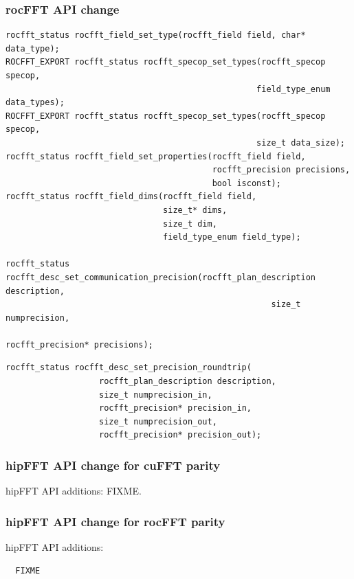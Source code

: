 \documentclass[12pt]{article}
\renewcommand{\(}{\left(}
\renewcommand{\)}{\right)}
\begin{document}
\subsubsection{rocFFT API change}
\begin{lstlisting}
rocfft_status rocfft_field_set_type(rocfft_field field, char* data_type);
ROCFFT_EXPORT rocfft_status rocfft_specop_set_types(rocfft_specop specop,
                                                   field_type_enum data_types);
ROCFFT_EXPORT rocfft_status rocfft_specop_set_types(rocfft_specop specop,
                                                   size_t data_size);
rocfft_status rocfft_field_set_properties(rocfft_field field,
                                          rocfft_precision precisions,
                                          bool isconst);
rocfft_status rocfft_field_dims(rocfft_field field,
                                size_t* dims,
                                size_t dim,
                                field_type_enum field_type);

rocfft_status rocfft_desc_set_communication_precision(rocfft_plan_description description,
                                                      size_t numprecision,
                                                      rocfft_precision* precisions);
\end{lstlisting}

\begin{lstlisting}
rocfft_status rocfft_desc_set_precision_roundtrip(
                   rocfft_plan_description description,
                   size_t numprecision_in,
                   rocfft_precision* precision_in,
                   size_t numprecision_out,
                   rocfft_precision* precision_out);
\end{lstlisting}


\subsubsection{hipFFT API change for cuFFT parity}

hipFFT API additions: FIXME.

\subsubsection{hipFFT API change for rocFFT parity}
\noindent
hipFFT API additions:
\begin{lstlisting}
  FIXME
\end{lstlisting}
\end{document}
